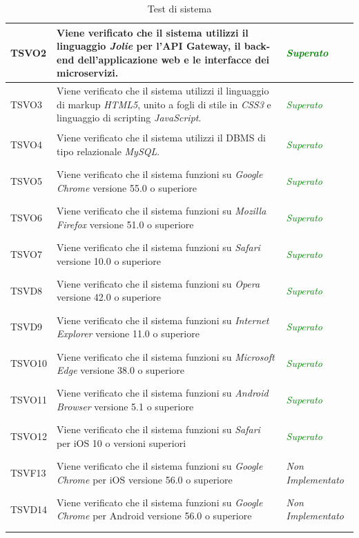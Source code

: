 \begin{longtable}{|>{\centering\arraybackslash}p{2.3cm}|>{\centering\arraybackslash}p{7.5cm} | >{\centering\arraybackslash}p{3.8cm}|}
		\hypertarget{TSVO2}{TSVO2} & Viene verificato che il sistema utilizzi il linguaggio \textit{Jolie} per l'API Gateway, il back-end dell'applicazione web e le interfacce dei microservizi. & \textcolor{Green}{\textit{Superato}}\\ \hline
		\hypertarget{TSVO3}{TSVO3} & Viene verificato che il sistema utilizzi il linguaggio di markup \textit{HTML5}, unito a fogli di stile in \textit{CSS3} e linguaggio di scripting \textit{JavaScript}. & \textcolor{Green}{\textit{Superato}}\\ \hline
		\hypertarget{TSVO4}{TSVO4} & Viene verificato che il sistema utilizzi il DBMS di tipo relazionale \textit{MySQL}. & \textcolor{Green}{\textit{Superato}}\\ \hline
		\hypertarget{TSVO5}{TSVO5} & Viene verificato che il sistema funzioni su \textit{Google Chrome} versione 55.0 o superiore & \textcolor{Green}{\textit{Superato}}\\ \hline
		\hypertarget{TSVO6}{TSVO6} & Viene verificato che il sistema funzioni su \textit{Mozilla Firefox} versione 51.0 o superiore & \textcolor{Green}{\textit{Superato}}\\ \hline
		\hypertarget{TSVO7}{TSVO7} & Viene verificato che il sistema funzioni su \textit{Safari} versione 10.0 o superiore & \textcolor{Green}{\textit{Superato}}\\ \hline
		\hypertarget{TSVD8}{TSVD8} & Viene verificato che il sistema funzioni su \textit{Opera} versione 42.0 o superiore & \textcolor{Green}{\textit{Superato}}\\ \hline
		\hypertarget{TSVD9}{TSVD9} & Viene verificato che il sistema funzioni su \textit{Internet Explorer} versione 11.0 o superiore & \textcolor{Green}{\textit{Superato}}\\ \hline
		\hypertarget{TSVO10}{TSVO10} & Viene verificato che il sistema funzioni su \textit{Microsoft Edge} versione 38.0 o superiore & \textcolor{Green}{\textit{Superato}}\\ \hline
		\hypertarget{TSVO11}{TSVO11} & Viene verificato che il sistema funzioni su \textit{Android Browser} versione 5.1 o superiore & \textcolor{Green}{\textit{Superato}}\\ \hline
		\hypertarget{TSVO12}{TSVO12} & Viene verificato che il sistema funzioni su \textit{Safari} per iOS 10 o versioni superiori & \textcolor{Green}{\textit{Superato}}\\ \hline
		\hypertarget{TSVF13}{TSVF13} & Viene verificato che il sistema funzioni su \textit{Google Chrome} per iOS versione 56.0 o superiore & \textit{Non Implementato}\\ \hline
		\hypertarget{TSVD14}{TSVD14} & Viene verificato che il sistema funzioni su \textit{Google Chrome} per Android versione 56.0 o superiore & \textit{Non Implementato}\\ \hline
		\caption[Test di sistema]{Test di sistema}
		\label{tabella:test2}
	\end{longtable}
	
